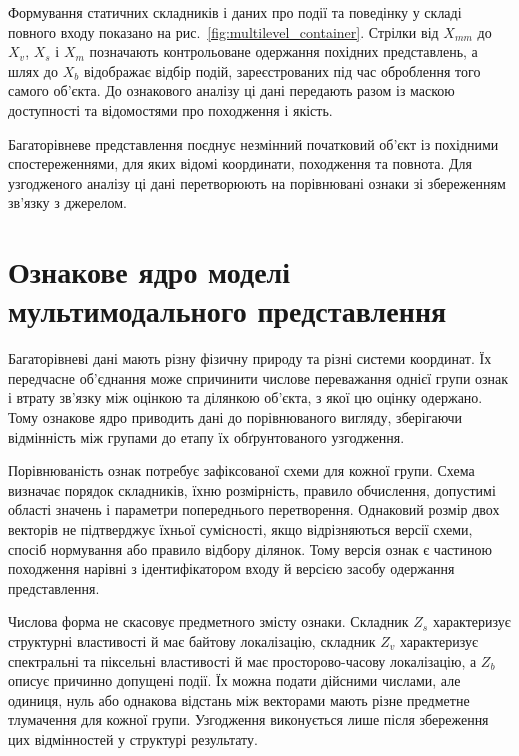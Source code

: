 Формування статичних складників і даних про події та поведінку у складі повного входу показано на рис.~\ref{fig:multilevel_container}. Стрілки від $X_{mm}$ до $X_v$, $X_s$ і $X_m$ позначають контрольоване одержання похідних представлень, а шлях до $X_b$ відображає відбір подій, зареєстрованих під час оброблення того самого об’єкта. До ознакового аналізу ці дані передають разом із маскою доступності та відомостями про походження і якість.



Багаторівневе представлення поєднує незмінний початковий об’єкт із похідними спостереженнями, для яких відомі координати, походження та повнота. Для узгодженого аналізу ці дані перетворюють на порівнювані ознаки зі збереженням зв’язку з джерелом.

\section{Ознакове ядро моделі мультимодального представлення}
\label{sec:feature_space}

Багаторівневі дані мають різну фізичну природу та різні системи координат. Їх передчасне об’єднання може спричинити числове переважання однієї групи ознак і втрату зв’язку між оцінкою та ділянкою об’єкта, з якої цю оцінку одержано. Тому ознакове ядро приводить дані до порівнюваного вигляду, зберігаючи відмінність між групами до етапу їх обґрунтованого узгодження.

Порівнюваність ознак потребує зафіксованої схеми для кожної групи. Схема визначає порядок складників, їхню розмірність, правило обчислення, допустимі області значень і параметри попереднього перетворення. Однаковий розмір двох векторів не підтверджує їхньої сумісності, якщо відрізняються версії схеми, спосіб нормування або правило відбору ділянок. Тому версія ознак є частиною походження нарівні з ідентифікатором входу й версією засобу одержання представлення.

Числова форма не скасовує предметного змісту ознаки. Складник $Z_s$ характеризує структурні властивості й має байтову локалізацію, складник $Z_v$ характеризує спектральні та піксельні властивості й має просторово-часову локалізацію, а $Z_b$ описує причинно допущені події. Їх можна подати дійсними числами, але одиниця, нуль або однакова відстань між векторами мають різне предметне тлумачення для кожної групи. Узгодження виконується лише після збереження цих відмінностей у структурі результату.

